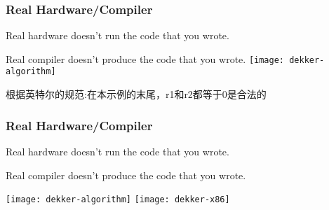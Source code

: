 \begin{frame}
    \frametitle{Real Hardware/Compiler}
    Real hardware doesn’t run the code that you wrote.
    
    Real compiler doesn’t produce the code that you wrote.
    \texttt{[image: dekker-algorithm]}
    
    根据英特尔的规范:在本示例的末尾，r1和r2都等于0是合法的
\end{frame}

\begin{frame}
    \frametitle{Real Hardware/Compiler}
    Real hardware doesn’t run the code that you wrote.
    
    Real compiler doesn’t produce the code that you wrote.
    
    \centering
    \texttt{[image: dekker-algorithm]}
    \texttt{[image: dekker-x86]}
\end{frame}

